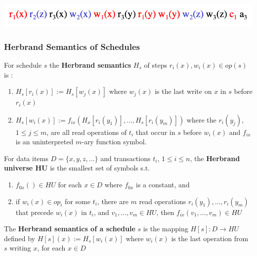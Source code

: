\documentclass[11pt]{article}
\begin{document}
\begin{center}
\includegraphics[width=.8\textwidth]{../images/bigdatabase/5.png}
\label{}
\end{center}
\subsubsection{Herbrand Semantics of Schedules}
\label{sec:org76b25ab}
\begin{definition}
For schedule \(s\) the \textbf{Herbrand semantics} \(H_s\) of steps \(r_i(x),w_i(x)\in op(s)\) is :
\begin{enumerate}
\item \(H_s[r_i(x)]:=H_s[w_j(x)]\) where \(w_j(x)\) is the last write on \(x\) in \(s\)
before \(r_i(x)\)
\item \(H_s[w_i(x)]:=f_{ix}(H_x[r_i(y_1)],\dots,H_s[r_i(y_m)])\) where
the \(r_i(y_j)\), \(1\le j\le m\), are all read operations of \(t_i\) that occur in \(s\)
before \(w_i(x)\) and \(f_{ix}\) is an uninterpreted \(m\)-ary function symbol.
\end{enumerate}
\end{definition}

\begin{definition}
For data items \(D=\{x,y,z,\dots\}\) and transactions \(t_i\), \(1\le i\le n\), the \textbf{Herbrand
universe HU} is the smallest set of symbols s.t.
\begin{enumerate}
\item \(f_{0x}()\in HU\) for each \(x\in D\) where \(f_{0x}\) is a constant, and
\item if \(w_i(x)\in op_i\) for some \(t_i\), there are \(m\) read
operations \(r_i(y_1),\dots,r_i(y_m)\) that precede \(w_i(x)\) in \(t_i\),
and \(v_1,\dots,v_m\in HU\), then \(f_{ix}(v_1,\dots,v_m)\in HU\)
\end{enumerate}
\end{definition}

\begin{definition}
The \textbf{Herbrand semantics of a schedule} \(s\) is the mapping \(H[s]:D\to HU\) defined
by \(H[s](x):=H_s[w_i(x)]\) where \(w_i(x)\) is the last operation from \(s\) writing \(x\), for
each \(x\in D\)
\end{definition}
\end{document}
